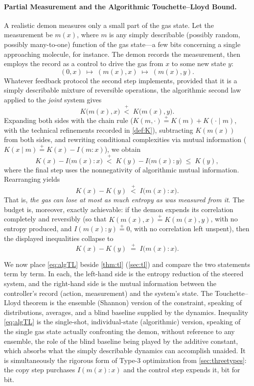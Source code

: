 \documentclass[11pt]{article}
\newcommand{\plt}{\mathrel{\stackrel{+}{<}}}
\newcommand{\peq}{\mathrel{\stackrel{+}{=}}}
\begin{document}
\paragraph{Partial Measurement and the Algorithmic Touchette--Lloyd Bound.} A realistic demon measures only a small part of the gas state. Let the measurement be $m(x)$, where $m$ is any simply describable (possibly random, possibly many-to-one) function of the gas state---a few bits concerning a single approaching molecule, for instance. The demon records the measurement, then employs the record as a control to drive the gas from $x$ to some new state $y$:
\[
(0, x) \;\mapsto\; (m(x), x) \;\mapsto\; (m(x), y).
\]
Whatever feedback protocol the second step implements, provided that it is a simply describable mixture of reversible operations, the algorithmic second law applied to the \emph{joint} system gives
\[
K\big(m(x), x\big) \;\plt\; K\big(m(x), y\big).
\]
Expanding both sides with the chain rule ($K(m,\cdot) \peq K(m) + K(\cdot \mid m)$, with the technical refinements recorded in \cref{def:K}), subtracting $K(m(x))$ from both sides, and rewriting conditional complexities via mutual information ($K(x \mid m) \peq K(x) - I(m : x)$), we obtain
\[
K(x) - I\big(m(x) : x\big) \;\plt\; K(y) - I\big(m(x) : y\big) \;\le\; K(y),
\]
where the final step uses the nonnegativity of algorithmic mutual information. Rearranging yields
\begin{equation}
\label{eq:algTL}
\boxed{\;K(x) - K(y) \;\plt\; I\big(m(x) : x\big).\;}
\end{equation}
That is, \emph{the gas can lose at most as much entropy as was measured from it}. The budget is, moreover, exactly achievable: if the demon expends its correlation completely and reversibly (so that $K(m(x), x) \peq K(m(x), y)$, with no entropy produced, and $I(m(x) : y) \peq 0$, with no correlation left unspent), then the displayed inequalities collapse to
\[
K(x) - K(y) \;\peq\; I\big(m(x) : x\big).
\]

We now place \eqref{eq:algTL} beside \cref{thm:tl} (\cref{sec:tl}) and compare the two statements term by term. In each, the left-hand side is the entropy reduction of the steered system, and the right-hand side is the mutual information between the controller's record (action, measurement) and the system's state. The Touchette--Lloyd theorem is the ensemble (Shannon) version of the constraint, speaking of distributions, averages, and a blind baseline supplied by the dynamics. Inequality \eqref{eq:algTL} is the single-shot, individual-state (algorithmic) version, speaking of the single gas state actually confronting the demon, without reference to any ensemble, the role of the blind baseline being played by the additive constant, which absorbs what the simply describable dynamics can accomplish unaided. It is simultaneously the rigorous form of Type-3 optimization from \cref{sec:threetypes}: the copy step purchases $I(m(x):x)$ and the control step expends it, bit for bit.
\end{document}
